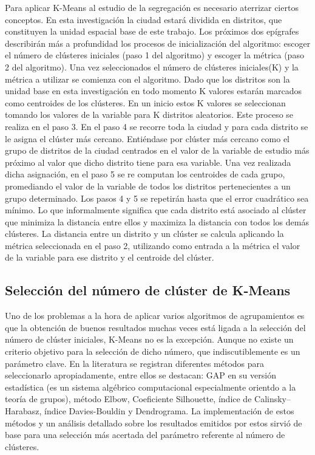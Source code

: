 Para aplicar K-Means al estudio de la segregación es necesario aterrizar ciertos conceptos. En esta investigación la ciudad estará dividida en distritos, que constituyen la unidad espacial base de este trabajo. Los próximos dos epígrafes describirán más a profundidad los procesos de inicialización del algoritmo: escoger el número de clústeres iniciales (paso 1 del algoritmo) y escoger la métrica (paso 2 del algoritmo). Una vez seleccionados el número de clústeres iniciales(K) y la métrica a utilizar se comienza con el algoritmo. Dado que los distritos son la unidad base en esta investigación en todo momento K valores estarán marcados como centroides de los clústeres. En un inicio estos K valores se seleccionan tomando los valores de la variable para K distritos aleatorios. Este proceso se realiza en el paso 3. En el paso 4 se recorre toda la ciudad y para cada distrito se le asigna el clúster más cercano. Entiéndase por clúster más cercano como el grupo de distritos de la ciudad centrados en el valor de la variable de estudio más próximo al valor que dicho distrito tiene para esa variable. Una vez realizada dicha asignación, en el paso 5 se re computan los centroides de cada grupo, promediando el valor de la variable de todos los distritos pertenecientes a un grupo determinado. Los pasos 4 y 5 se repetirán hasta que el error cuadrático sea mínimo. Lo que informalmente significa que cada distrito está asociado al clúster que minimiza la distancia entre ellos y maximiza la distancia con todos los demás clústeres. La distancia entre un distrito y un clúster se calcula aplicando la métrica seleccionada en el paso 2, utilizando como entrada a la métrica el valor de la variable para ese distrito y el centroide del clúster.
\subsection{Selección del número de clúster de K-Means}
Uno de los problemas a la hora de aplicar varios algoritmos de agrupamientos es que la obtención de buenos resultados muchas veces está ligada a la selección del número de clúster iniciales, K-Means no es la excepción. Aunque no existe un criterio objetivo para la selección de dicho número, que indiscutiblemente es un parámetro clave. En la literatura se registran diferentes métodos para seleccionarlo apropiadamente, entre ellos se destacan: GAP en su versión estadística (es un sistema algébrico computacional especialmente orientdo a la teoría de grupos), método Elbow, Coeficiente Silhouette, índice de Calinsky--Harabasz, índice Davies-Bouldin y Dendrograma. La implementación de estos métodos y un análisis detallado sobre los resultados emitidos por estos sirvió de base para una selección más acertada del parámetro referente al número de clústeres.

